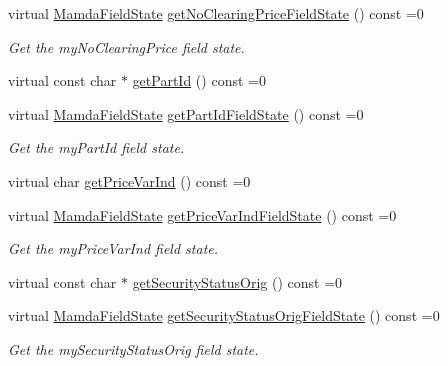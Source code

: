 \begin{CompactItemize}
virtual \hyperlink{namespaceWombat_93aac974f2ab713554fd12a1fa3b7d2a}{Mamda\-Field\-State} \hyperlink{classWombat_1_1MamdaOrderImbalanceUpdate_2d5900fdfa09d42ed5df1f063f0c21a4}{get\-No\-Clearing\-Price\-Field\-State} () const =0
\begin{CompactList}\small\item\em Get the my\-No\-Clearing\-Price field state. \item\end{CompactList}\item 
virtual const char $\ast$ \hyperlink{classWombat_1_1MamdaOrderImbalanceUpdate_227deba90a0c151d51e60505c296e734}{get\-Part\-Id} () const =0
\item 
virtual \hyperlink{namespaceWombat_93aac974f2ab713554fd12a1fa3b7d2a}{Mamda\-Field\-State} \hyperlink{classWombat_1_1MamdaOrderImbalanceUpdate_20f8acc3d8d9fca3cf6db1ca24ef1980}{get\-Part\-Id\-Field\-State} () const =0
\begin{CompactList}\small\item\em Get the my\-Part\-Id field state. \item\end{CompactList}\item 
virtual char \hyperlink{classWombat_1_1MamdaOrderImbalanceUpdate_922da85eb49fa7fa9753a2ef5b743f3c}{get\-Price\-Var\-Ind} () const =0
\item 
virtual \hyperlink{namespaceWombat_93aac974f2ab713554fd12a1fa3b7d2a}{Mamda\-Field\-State} \hyperlink{classWombat_1_1MamdaOrderImbalanceUpdate_d39f5c530b11d89f10c21d9307dfc4c3}{get\-Price\-Var\-Ind\-Field\-State} () const =0
\begin{CompactList}\small\item\em Get the my\-Price\-Var\-Ind field state. \item\end{CompactList}\item 
virtual const char $\ast$ \hyperlink{classWombat_1_1MamdaOrderImbalanceUpdate_4431d1fef6fab38116d2ecf8b3a404f9}{get\-Security\-Status\-Orig} () const =0
\item 
virtual \hyperlink{namespaceWombat_93aac974f2ab713554fd12a1fa3b7d2a}{Mamda\-Field\-State} \hyperlink{classWombat_1_1MamdaOrderImbalanceUpdate_ce9f85429dfd33b084286bffbe768d9d}{get\-Security\-Status\-Orig\-Field\-State} () const =0
\begin{CompactList}\small\item\em Get the my\-Security\-Status\-Orig field state. \item\end{CompactList}\item 

\end{CompactItemize}
